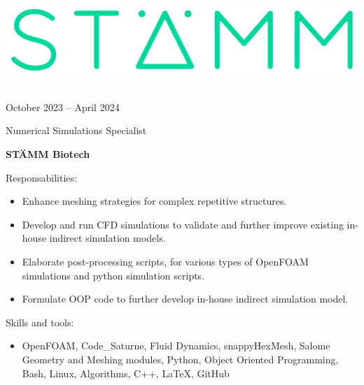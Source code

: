 \documentclass[a4paper,10pt]{article}
\newlength{\cvcolumngapwidth}
\newlength{\cvleftcolumnwidth}
\newlength{\cvrightcolumnwidth}
\newcommand{\cvtitlestyle}[1]{{\large\cvtitlefont\textcolor{cvtitlecolor}{#1}}}
\newcommand{\cvdurationstyle}[1]{{\small\cvdurationfont\textcolor{cvdurationcolor}{#1}}}
\newlength{\cvafteritemskipamount}
\newlength{\cvaftertitleskipamount}
\newlength{\cvparskip}
\newcommand{\cvitem}[2]{
    \begin{minipage}[t]{\cvleftcolumnwidth}
        \raggedleft #1
    \end{minipage}%
    \hspace{\cvcolumngapwidth}%
    \begin{minipage}[t]{\cvrightcolumnwidth}
        \setlength{\parskip}{\cvparskip} #2
    \end{minipage}

    \vspace{\cvafteritemskipamount}
}
\newcommand{\cvtitle}[1]{
    \cvtitlestyle{#1}

    \vspace{\cvaftertitleskipamount}
    \vspace{-\cvparskip}
}
\begin{document}
\cvitem{
	\begin{minipage}{\textwidth}
    \begin{flushright}
		  \includegraphics[height=0.15\textwidth]{../../../../logos-photos/Logo_STAMM.png}   
    \end{flushright}  
  \end{minipage} \\
  \vspace{0.3cm}
  \cvdurationstyle{October 2023 -- April 2024}\\
}{
	
  \cvtitle{Numerical Simulations Specialist}
  \textbf{\large STÄMM Biotech}

  
  Responsabilities:
  \begin{itemize}
    \item Enhance meshing strategies for complex repetitive structures. 
    \item Develop and run CFD simulations to validate and further improve existing in-house indirect simulation models.
    \item Elaborate post-processing scripts, for various types of OpenFOAM simulations and python simulation scripts.
    \item Formulate OOP code to further develop in-house indirect simulation model.
  \end{itemize}
  
  Skills and tools:
  \begin{itemize}
    \item OpenFOAM, Code\_Saturne, Fluid Dynamics, snappyHexMesh, Salome Geometry and Meshing modules, Python, Object Oriented
      Programming, Bash, Linux, Algorithms, C++, LaTeX, GitHub
  \end{itemize}
	
}
\end{document}
